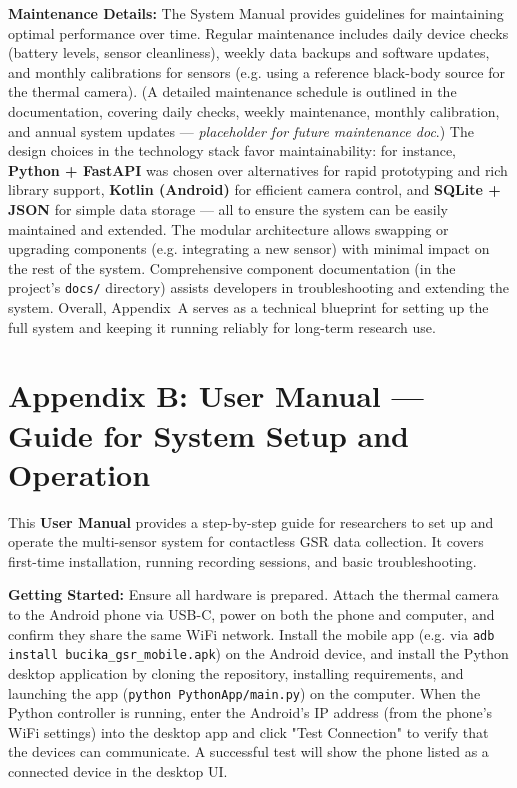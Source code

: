 \textbf{Maintenance Details:} The System Manual provides guidelines for
maintaining optimal performance over time. Regular maintenance includes
daily device checks (battery levels, sensor cleanliness), weekly data
backups and software updates, and monthly calibrations for sensors (e.g.
using a reference black-body source for the thermal camera). (A detailed
maintenance schedule is outlined in the documentation, covering daily
checks, weekly maintenance, monthly calibration, and annual system
updates --- \textit{placeholder for future maintenance
doc}\cite{WHOStressDefinition}.)
The design choices in the technology stack favor maintainability: for
instance, \textbf{Python + FastAPI} was chosen over alternatives for rapid
prototyping and rich library support, \textbf{Kotlin (Android)} for efficient
camera control, and \textbf{SQLite + JSON} for simple data storage --- all to
ensure the system can be easily maintained and
extended\cite{CortisolStressIndicator2020}.
The modular architecture allows swapping or upgrading components (e.g.
integrating a new sensor) with minimal impact on the rest of the system.
Comprehensive component documentation (in the project's \texttt{docs/}
directory) assists developers in troubleshooting and extending the
system\cite{ElectrodermalActivityWiki}.
Overall, Appendix A serves as a technical blueprint for setting up the
full system and keeping it running reliably for long-term research use.

\section{Appendix B: User Manual --- Guide for System Setup and Operation}

This \textbf{User Manual} provides a step-by-step guide for researchers to
set up and operate the multi-sensor system for contactless GSR data
collection. It covers first-time installation, running recording
sessions, and basic troubleshooting.

\textbf{Getting Started:} Ensure all hardware is prepared. Attach the thermal
camera to the Android phone via USB-C, power on both the phone and
computer, and confirm they share the same WiFi
network\cite{DeviceServer}.
Install the mobile app (e.g. via \texttt{adb install bucika_gsr_mobile.apk}) on
the Android device, and install the Python desktop application by
cloning the repository, installing requirements, and launching the app
(\texttt{python PythonApp/main.py}) on the
computer\cite{GSRPPGMachineLearning2024}.
When the Python controller is running, enter the Android's IP address
(from the phone's WiFi settings) into the desktop app and click "Test
Connection" to verify that the devices can
communicate\cite{SimulatorValidityPhysiological2025}.
A successful test will show the phone listed as a connected device in
the desktop UI.

